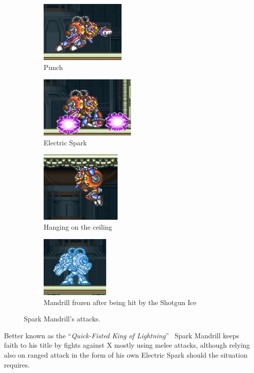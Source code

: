 \begin{figure}[htp]
	\centering
	\begin{subfigure}{0.49\linewidth}
		\centering
		\includegraphics[height=3cm]{figures/X1/Spark_mandrill/Mandrill_punch.jpg}
		\caption{Punch}
	\end{subfigure}
	\begin{subfigure}{0.49\linewidth}
		\centering
		\includegraphics[height=3cm]{figures/X1/Spark_mandrill/Mandrill_spark.jpg}
		\caption{Electric Spark}
	\end{subfigure}
	\begin{subfigure}[t]{0.45\linewidth}
		\centering
		\includegraphics[height=3.5cm]{figures/X1/Spark_mandrill/Mandrill_hang.jpg}
		\caption{Hanging on the ceiling}
	\end{subfigure}
	\begin{subfigure}[t]{0.45\linewidth}
		\centering
		\includegraphics[height=3cm]{figures/X1/Spark_mandrill/Mandrill_frozen.jpg}
		\caption{Mandrill frozen after being hit by the Shotgun Ice}
	\end{subfigure}
	\caption{Spark Mandrill's attacks.}
\end{figure}
Better known as the ``\textit{Quick-Fisted King of Lightning}''~\cite{book:MMX_Complete_art} Spark Mandrill keeps faith to his title by fights against X mostly using melee attacks, although relying also on ranged attack in the form of his own Electric Spark should the situation requires.
